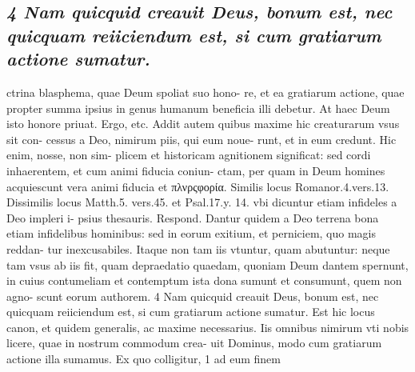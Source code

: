 \documentclass{article}
\begin{document}
\begin{pages}
\subsection*{\textit{4 Nam quicquid creauit Deus, bonum est, nec quicquam reiiciendum est, si cum gratiarum actione sumatur.}}ctrina blasphema, quae Deum spoliat suo hono- re, et ea gratiarum actione, quae propter summa ipsius in genus humanum beneficia illi debetur. At haec Deum isto honore priuat. Ergo, etc. Addit autem quibus maxime hic creaturarum vsus sit con- cessus a Deo, nimirum piis, qui eum noue- runt, et in eum credunt. Hic enim, nosse, non sim- plicem et historicam agnitionem significat: sed cordi inhaerentem, et cum animi fiducia coniun- ctam, per quam in Deum homines acquiescunt vera animi fiducia et πλνρςφορία. Similis locus Romanor.4.vers.13. Dissimilis locus Matth.5. vers.45. et Psal.17.y. 14. vbi dicuntur etiam infideles a Deo impleri i- psius thesauris. Respond. Dantur quidem a Deo terrena bona etiam infidelibus hominibus: sed in eorum exitium, et perniciem, quo magis reddan- tur inexcusabiles. Itaque non tam iis vtuntur, quam abutuntur: neque tam vsus ab iis fit, quam depraedatio quaedam, quoniam Deum dantem spernunt, in cuius contumeliam et contemptum ista dona sumunt et consumunt, quem non agno- scunt eorum authorem. 4 Nam quicquid creauit Deus, bonum est, nec quicquam reiiciendum est, si cum gratiarum actione sumatur. Est hic locus canon, et quidem generalis, ac maxime necessarius. Iis omnibus nimirum vti nobis licere, quae in nostrum commodum crea- uit Dominus, modo cum gratiarum actione illa sumamus. Ex quo colligitur, 1 ad eum finem  \pend

\end{pages}
\end{document}
